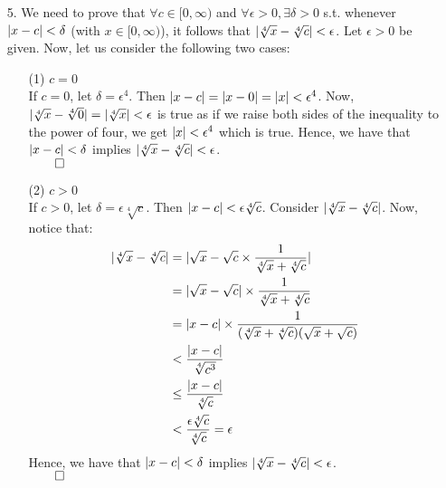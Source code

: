 \documentclass[11pt]{article}
\DeclarePairedDelimiter\abs{\lvert}{\rvert}%
\begin{document}
\begin{itemize}
    \item[5.]
        We need to prove that $\forall c \in [0, \infty)$ and
        $\forall \epsilon > 0, \exists \delta > 0$ s.t. whenever
        $\abs{x - c} < \delta$ (with $x \in [0, \infty)$), it follows that
        $\abs{\sqrt[4]{x} - \sqrt[4]{c}} < \epsilon$.
        Let $\epsilon > 0$ be given. Now, let us consider the following two
        cases:
        \begin{itemize}
            \item[(1)]
                $c = 0$\\
                If $c = 0$, let $\delta = \epsilon^4$. Then
                $\abs{x - c} = \abs{x - 0} = \abs{x} < \epsilon^4$.
                Now,
                $\abs{\sqrt[4]{x} - \sqrt[4]{0}} = \abs{\sqrt[4]{x}} < \epsilon$
                is true as if we raise both sides of the inequality to the
                power of four, we get $\abs{x} < \epsilon^4$ which is true.
                Hence, we have that $\abs{x - c} < \delta$ implies
                $\abs{\sqrt[4]{x} - \sqrt[4]{c}} < \epsilon$.\\
                $\qed$

            \item[(2)]
                $c > 0$\\
                If $c > 0$, let $\delta = \epsilon\sqrt[4]{c}$. Then
                $\abs{x - c} < \epsilon\sqrt[4]{c}$.
                Consider $\abs{\sqrt[4]{x} - \sqrt[4]{c}}$. Now, notice that:
                \begin{align*}
                    \abs{\sqrt[4]{x} - \sqrt[4]{c}} &= \abs{\sqrt{x} - \sqrt{c} \times \dfrac{1}{\sqrt[4]{x} + \sqrt[4]{c}}}\\
                                                    &= \abs{\sqrt{x} - \sqrt{c}} \times \dfrac{1}{\sqrt[4]{x} + \sqrt[4]{c}}\\
                                                    &= \abs{x - c} \times \dfrac{1}{(\sqrt[4]{x} + \sqrt[4]{c})(\sqrt{x} + \sqrt{c})}\\
                                                    &< \dfrac{\abs{x - c}}{\sqrt[4]{c^3}}\\
                                                    &\leq \dfrac{\abs{x - c}}{\sqrt[4]{c}}\\
                                                    &< \dfrac{\epsilon\sqrt[4]{c}}{\sqrt[4]{c}} = \epsilon
                \end{align*}
                Hence, we have that $\abs{x - c} < \delta$ implies
                $\abs{\sqrt[4]{x} - \sqrt[4]{c}} < \epsilon$.\\
                $\qed$
        \end{itemize}


\end{itemize}
\end{document}
